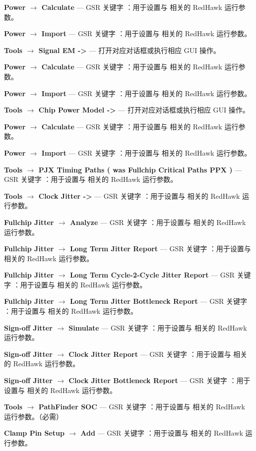 \textbf{Power $\rightarrow$ Calculate} — GSR 关键字 ：用于设置与  相关的 RedHawk 运行参数。

\textbf{Power $\rightarrow$ Import} — GSR 关键字 ：用于设置与  相关的 RedHawk 运行参数。

\textbf{Tools $\rightarrow$ Signal EM ->} — 打开对应对话框或执行相应 GUI 操作。

\textbf{Power $\rightarrow$ Calculate} — GSR 关键字 ：用于设置与  相关的 RedHawk 运行参数。

\textbf{Power $\rightarrow$ Import} — GSR 关键字 ：用于设置与  相关的 RedHawk 运行参数。

\textbf{Tools $\rightarrow$ Chip Power Model ->} — 打开对应对话框或执行相应 GUI 操作。

\textbf{Power $\rightarrow$ Calculate} — GSR 关键字 ：用于设置与  相关的 RedHawk 运行参数。

\textbf{Power $\rightarrow$ Import} — GSR 关键字 ：用于设置与  相关的 RedHawk 运行参数。

\textbf{Tools $\rightarrow$ PJX Timing Paths ( was Fullchip Critical Paths PPX )} — GSR 关键字 ：用于设置与  相关的 RedHawk 运行参数。

\textbf{Tools $\rightarrow$ Clock Jitter ->} — GSR 关键字 ：用于设置与  相关的 RedHawk 运行参数。

\textbf{Fullchip Jitter $\rightarrow$ Analyze} — GSR 关键字 ：用于设置与  相关的 RedHawk 运行参数。

\textbf{Fullchip Jitter $\rightarrow$ Long Term Jitter Report} — GSR 关键字 ：用于设置与  相关的 RedHawk 运行参数。

\textbf{Fullchip Jitter $\rightarrow$ Long Term Cycle-2-Cycle Jitter Report} — GSR 关键字 ：用于设置与  相关的 RedHawk 运行参数。

\textbf{Fullchip Jitter $\rightarrow$ Long Term Jitter Bottleneck Report} — GSR 关键字 ：用于设置与  相关的 RedHawk 运行参数。

\textbf{Sign-off Jitter $\rightarrow$ Simulate} — GSR 关键字 ：用于设置与  相关的 RedHawk 运行参数。

\textbf{Sign-off Jitter $\rightarrow$ Clock Jitter Report} — GSR 关键字 ：用于设置与  相关的 RedHawk 运行参数。

\textbf{Sign-off Jitter $\rightarrow$ Clock Jitter Bottleneck Report} — GSR 关键字 ：用于设置与  相关的 RedHawk 运行参数。

\textbf{Tools $\rightarrow$ PathFinder SOC} — GSR 关键字 ：用于设置与  相关的 RedHawk 运行参数。（必需）

\textbf{Clamp Pin Setup $\rightarrow$ Add} — GSR 关键字 ：用于设置与  相关的 RedHawk 运行参数。

